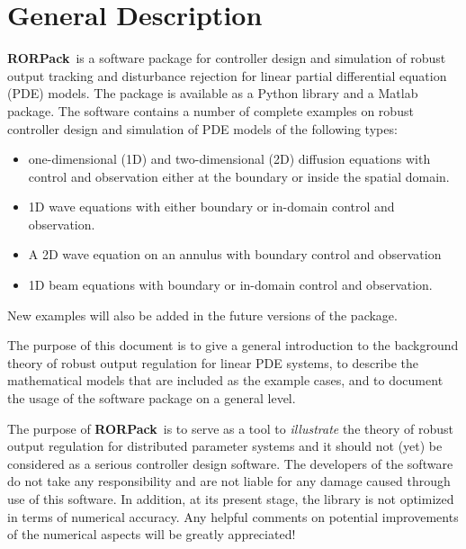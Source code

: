 \documentclass[11pt, a4paper]{amsart}
\theoremstyle{definition}
\numberwithin{equation}{section}
\newcommand{\RORname}{\textbf{RORPack}}
\begin{document}
\section{General Description}

\RORname\ is a software package
for controller design and simulation of robust output tracking and disturbance rejection for linear partial differential equation (PDE) models. 
The package is available as a Python library and a Matlab package.
The software contains a number of complete examples on robust controller design and simulation of PDE models
of the following types:
\begin{itemize}
  \item one-dimensional (1D) and two-dimensional (2D) diffusion equations with control and observation either at the boundary or inside the spatial domain.
  \item 1D wave equations with either boundary or in-domain control and observation.
    \item A 2D wave equation on an annulus with boundary control and observation
\item 1D beam equations with boundary or in-domain control and observation.
\end{itemize}
New examples will also be added in the future versions of the package.

The purpose of this document is to give a general introduction to the background theory of robust output regulation for linear PDE systems, to describe the mathematical models that are included as the example cases, and to document the usage of the software package on a general level.
 
The purpose of \RORname\ is to serve as a tool to \textit{illustrate} the theory of robust output regulation for distributed parameter systems and it should not (yet) be considered as a serious controller design software. 
The developers of the software do not take any responsibility and are not liable for any damage caused through use of this software.
In addition, at its present stage, the library is not optimized in terms of numerical accuracy. Any helpful comments on potential improvements of the numerical aspects will be greatly appreciated!
\end{document}
